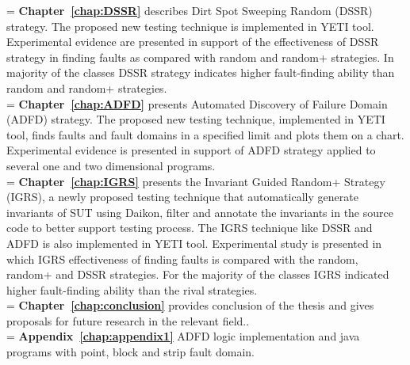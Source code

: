 \hangindent=\parindent
{}
\noindent
\textbf{Chapter~\ref{chap:DSSR}} describes Dirt Spot Sweeping Random (DSSR) strategy. The proposed new testing technique is implemented in YETI tool. Experimental evidence are presented in support of the effectiveness of DSSR strategy in finding faults as compared with random and random+ strategies. In majority of the classes DSSR strategy indicates higher fault-finding ability than random and random+ strategies. \\

\hangindent=\parindent
{}
\noindent
\textbf{Chapter~\ref{chap:ADFD}} presents Automated Discovery of Failure Domain (ADFD) strategy. The proposed new testing technique, implemented in YETI tool, finds faults and fault domains in a specified limit and plots them on a chart. Experimental evidence is presented in support of ADFD strategy applied to several one and two dimensional programs. \\

 
\hangindent=\parindent
{}
\noindent
\textbf{Chapter~\ref{chap:IGRS}} presents the Invariant Guided Random+ Strategy (IGRS), a newly proposed testing technique that automatically generate invariants of SUT using Daikon, filter and annotate the invariants in the source code to better support testing process. The IGRS technique like DSSR and ADFD is also implemented in YETI tool. Experimental study is presented in which IGRS effectiveness of finding faults is compared with the random, random+ and DSSR strategies. For the majority of the classes IGRS indicated higher fault-finding ability than the rival strategies.\\

\hangindent=\parindent
{}
\noindent
\textbf{Chapter~\ref{chap:conclusion}} provides conclusion of the thesis and gives proposals for future research in the relevant field.. \\

 \hangindent=\parindent
 \noindent
 \textbf{Appendix~\ref{chap:appendix1}} ADFD logic implementation and java programs with point, block and strip fault domain.\\

